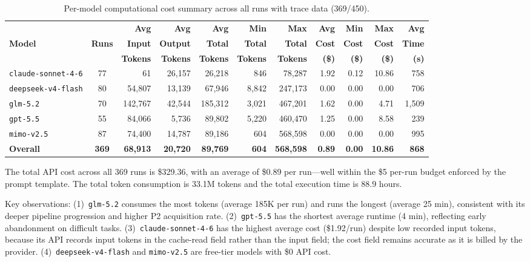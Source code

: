 \begin{table}[t]
\centering

\footnotesize
\renewcommand{\arraystretch}{1.1}
\setlength{\tabcolsep}{4pt}
\begin{tabular}{l c r r r r r r r r r}
\toprule
 & & \textbf{Avg} & \textbf{Avg} & \textbf{Avg} & \textbf{Min} & \textbf{Max} & \textbf{Avg} & \textbf{Min} & \textbf{Max} & \textbf{Avg} \\
\textbf{Model} & \textbf{Runs} & \textbf{Input} & \textbf{Output} & \textbf{Total} & \textbf{Total} & \textbf{Total} & \textbf{Cost} & \textbf{Cost} & \textbf{Cost} & \textbf{Time} \\
 & & \textbf{Tokens} & \textbf{Tokens} & \textbf{Tokens} & \textbf{Tokens} & \textbf{Tokens} & \textbf{(\$)} & \textbf{(\$)} & \textbf{(\$)} & \textbf{(s)} \\
\midrule
\texttt{claude-sonnet-4-6} & 77 & 61 & 26,157 & 26,218 & 846 & 78,287 & 1.92 & 0.12 & 10.86 & 758 \\
\texttt{deepseek-v4-flash} & 80 & 54,807 & 13,139 & 67,946 & 8,842 & 247,173 & 0.00 & 0.00 & 0.00 & 706 \\
\texttt{glm-5.2} & 70 & 142,767 & 42,544 & 185,312 & 3,021 & 467,201 & 1.62 & 0.00 & 4.71 & 1,509 \\
\texttt{gpt-5.5} & 55 & 84,066 & 5,736 & 89,802 & 5,220 & 460,470 & 1.25 & 0.00 & 8.58 & 239 \\
\texttt{mimo-v2.5} & 87 & 74,400 & 14,787 & 89,186 & 604 & 568,598 & 0.00 & 0.00 & 0.00 & 995 \\
\midrule
\textbf{Overall} & \textbf{369} & \textbf{68,913} & \textbf{20,720} & \textbf{89,769} & \textbf{604} & \textbf{568,598} & \textbf{0.89} & \textbf{0.00} & \textbf{10.86} & \textbf{868} \\
\bottomrule
\end{tabular}
\caption{Per-model computational cost summary across all runs with trace data (369/450).}
\label{tab:cost}
\end{table}

The total API cost across all 369 runs is \$329.36, with an average of \$0.89 per run---well within the \$5 per-run budget enforced by the prompt template. The total token consumption is 33.1M tokens and the total execution time is 88.9 hours.

Key observations: (1)~\texttt{glm-5.2} consumes the most tokens (average 185K per run) and runs the longest (average 25 min), consistent with its deeper pipeline progression and higher P2 acquisition rate. (2)~\texttt{gpt-5.5} has the shortest average runtime (4 min), reflecting early abandonment on difficult tasks. (3)~\texttt{claude-sonnet-4-6} has the highest average cost (\$1.92/run) despite low recorded input tokens, because its API records input tokens in the cache-read field rather than the input field; the cost field remains accurate as it is billed by the provider. (4)~\texttt{deepseek-v4-flash} and \texttt{mimo-v2.5} are free-tier models with \$0 API cost.
